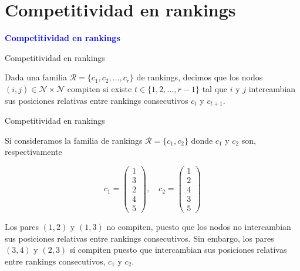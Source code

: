 \documentclass[10pt,hyperref={unicode}]{beamer}
\begin{document}
	
	\section{Competitividad en rankings}
	
	\begin{frame}
		\begin{center}
			\Huge\textbf{\textsf{\textcolor{blue}{Competitividad en rankings}}}
		\end{center}
	\end{frame}
	
	\begin{frame}{Competitividad en rankings}
		\begin{defi}
			Dada una familia $\mathcal{R} = \{c_1, c_2, \dots, c_r\}$ de rankings, decimos que los nodos $(i,j) \in \mathcal{N} \times \mathcal{N}$ compiten si existe $t \in \{1,2,\dots, r-1\}$ tal que $i$ y $j$ intercambian sus posiciones relativas entre rankings consecutivos $c_t$ y $c_{t+1}$.
		\end{defi}
	\end{frame}
	
	\begin{frame}{Competitividad en rankings}
		\begin{ejemplo}
			Si consideramos la familia de rankings $\mathcal{R} = \{c_1, c_2\}$ donde $c_1$ y $c_2$ son, respectivamente
			
			\begin{equation*}
			c_1 = \left( \begin{array}{c}
			1\\
			3\\
			2\\
			4\\
			5
			\end{array} \right), \quad
			c_2 = \left( \begin{array}{c}
			1\\
			2\\
			4\\
			3\\
			5
			\end{array} \right)
			\end{equation*}
			
			Los pares $(1,2)$ y $(1,3)$ no compiten, puesto que los nodos no intercambian sus posiciones relativas entre rankings consecutivos. Sin embargo, los pares $(3,4)$ y $(2,3)$ sí compiten puesto que intercambian sus posiciones relativas entre rankings consecutivos, $c_1$ y $c_2$.
		\end{ejemplo}
	\end{frame}
	
\end{document}
